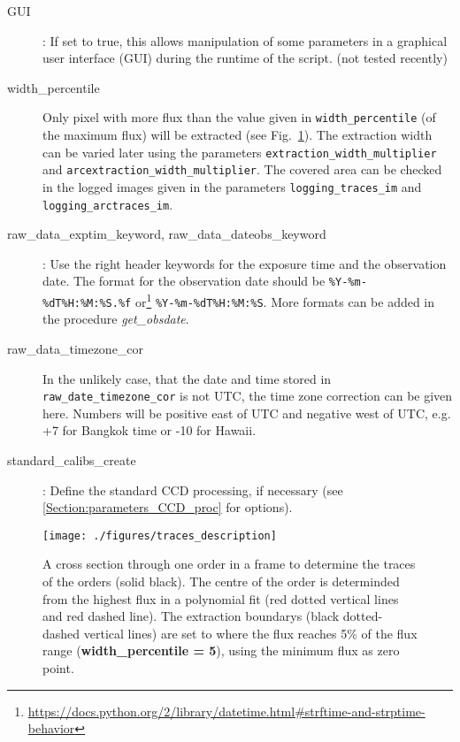 \documentclass[10pt,a4paper]{article}
\begin{document}
\begin{description}
  \item[GUI] : If set to true, this allows manipulation of some parameters in a graphical user interface (GUI) during the runtime of the script. (not tested recently)
  \item[width\_percentile] Only pixel with more flux than the value given in \verb|width_percentile| (of the maximum flux) will be extracted (see Fig.~\ref{Fig:traces_description}). The extraction width can be varied later using the parameters \verb|extraction_width_multiplier| and \verb|arcextraction_width_multiplier|. The covered area can be checked in the logged images given in the parameters \verb|logging_traces_im| and \verb|logging_arctraces_im|. %
  \item[raw\_data\_exptim\_keyword, raw\_data\_dateobs\_keyword] : Use the right header keywords for the exposure time and the observation date. The format for the observation date should be \verb|%Y-%m-%dT%H:%M:%S.%f| or\footnote{\url{https://docs.python.org/2/library/datetime.html\#strftime-and-strptime-behavior}} \verb|%Y-%m-%dT%H:%M:%S|. More formats can be added in the procedure \textit{get\_obsdate}.
  \item[raw\_data\_timezone\_cor] In the unlikely case, that the date and time stored in \verb|raw_date_timezone_cor| is not UTC, the time zone correction can be given here. Numbers will be positive east of UTC and negative west of UTC, e.g. +7 for Bangkok time or -10 for Hawaii.
  \item[standard\_calibs\_create] : Define the standard CCD processing, if necessary (see \ref{Section:parameters_CCD_proc} for options).
\end{description}

\begin{figure} 
  \begin{center}
    \texttt{[image: ./figures/traces\_description]}
  \end{center} 
  \caption{A cross section through one order in a frame to determine the traces of the orders (solid black). The centre of the order is determinded from the highest flux in a polynomial fit (red dotted vertical lines and red dashed line). The extraction boundarys (black dotted-dashed vertical lines) are set to where the flux reaches 5\% of the flux range (\textbf{width\_percentile = 5}), using the minimum flux as zero point.
    \label{Fig:traces_description}}
\end{figure}
\end{document}

